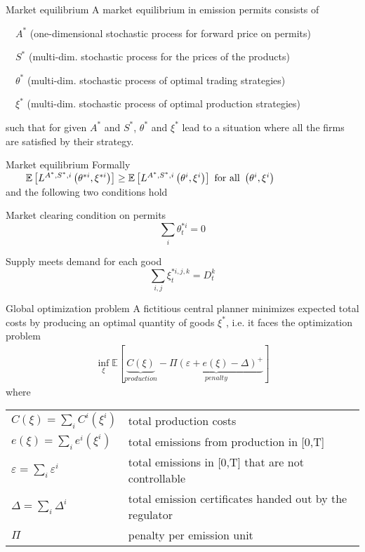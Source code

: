 {Market equilibrium}
A market equilibrium in emission permits consists of


$\quad A^*$ (one-dimensional stochastic process for forward price on permits)

	$\quad S^*$ (multi-dim. stochastic process for the prices of the products)

	$\quad \theta^*$ (multi-dim. stochastic process of optimal trading strategies)

	$\quad \xi^*$ (multi-dim. stochastic process of optimal production strategies)


such that for given $A^*$ and $S^*$,
$\theta^*$ and $\xi^*$ lead to a situation where all the firms are satisfied by their strategy.

{Market equilibrium}
Formally
$
\qquad \mathbb{E}\left[ L^{A^*, S^*, i}\left(\theta^{*i},\xi^{*i}\right) \right] \ge \mathbb{E}\left[ L^{A^*, S^*, i}\left(\theta^{i},\xi^{i}\right) \right] \textnormal{ for all } \left(\theta^i, \xi^i \right)
$ \\
and the following two conditions hold


	Market clearing condition on permits
$$
\sum_{i} \theta^{*i}_t = 0
$$

	Supply meets demand for each good
$$
\sum_{i, j} \xi^{*i,j,k}_t = D_t^k
$$



{Global optimization problem}
A fictitious central planner minimizes expected total costs by producing an optimal quantity of goods $\xi^*$, i.e. it faces the optimization problem
\begin{align}
\inf_{\xi} \mathbb{E} \left[ \underbrace{C(\xi)}_{production} - \underbrace{\Pi \left(\varepsilon + e(\xi) - \Delta \right)^+}_{penalty} \right]
\end{align}
where \\
\begin{tabular}{ll}
$C(\xi) =  \sum_{i} C^i(\xi^i)$ & total production costs\\
$e(\xi) = \sum_{i} e^i(\xi^i)$ & total emissions from production in [0,T] \\
$\varepsilon = \sum_{i} \varepsilon^i$ & total emissions in [0,T] that are not controllable \\
$\Delta = \sum_{i} \Delta^i$ & total emission certificates handed out by the regulator \\
$\Pi$ & penalty per emission unit \\
\end{tabular}

